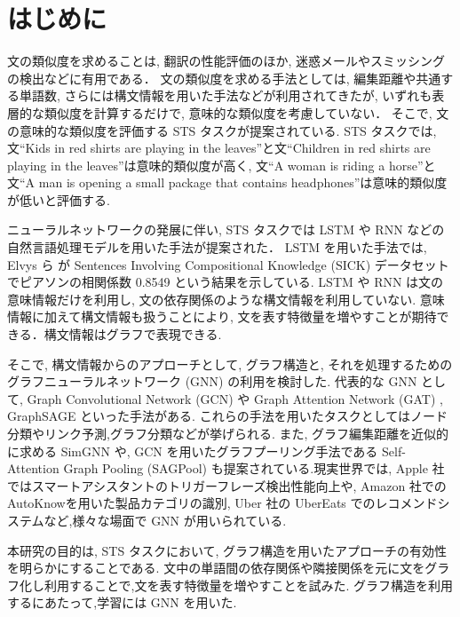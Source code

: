 \documentclass[a4j,12pt]{thesis} %
\begin{document}
\newcommand{\ctext}[1]{\raise0.2ex\hbox{\textcircled{\scriptsize{#1}}}}
\setlength{\baselineskip}{1.95zw}
\setlength{\textheight}{30\baselineskip}
\mainmatter

\fi
\renewcommand\thefootnote{\arabic{footnote}}



\chapter{はじめに}\label{intro}
文の類似度を求めることは, 翻訳の性能評価のほか, 迷惑メールやスミッシングの検出などに有用である．
文の類似度を求める手法としては, 編集距離や共通する単語数, さらには構文情報を用いた手法などが利用されてきたが, いずれも表層的な類似度を計算するだけで, 意味的な類似度を考慮していない．
そこで, 文の意味的な類似度を評価する STS タスクが提案されている.
STS タスクでは, 文``Kids in red shirts are playing in the leaves''と文``Children in red shirts are playing in the leaves''は意味的類似度が高く, 文``A woman is riding a horse''と文``A man is opening a small package that contains headphones''は意味的類似度が低いと評価する.
\par ニューラルネットワークの発展に伴い, STS タスクでは LSTM や RNN などの自然言語処理モデルを用いた手法が提案された．
LSTM を用いた手法では, Elvys ら \cite{elvys2018predicting} が Sentences Involving Compositional Knowledge (SICK) データセットでピアソンの相関係数 0.8549 という結果を示している.
LSTM や RNN は文の意味情報だけを利用し, 文の依存関係のような構文情報を利用していない.
意味情報に加えて構文情報も扱うことにより, 文を表す特徴量を増やすことが期待できる．構文情報はグラフで表現できる.
\par そこで, 構文情報からのアプローチとして, グラフ構造と, それを処理するためのグラフニューラルネットワーク (GNN) の利用を検討した.
代表的な GNN として, Graph Convolutional Network (GCN) \cite{kipf2017semi} や Graph Attention Network (GAT) \cite{velickovic2018graph}, GraphSAGE \cite{hamilton2017inductive} といった手法がある. これらの手法を用いたタスクとしてはノード分類やリンク予測,グラフ分類などが挙げられる. また, グラフ編集距離を近似的に求める SimGNN や, GCN を用いたグラフプーリング手法である Self-Attention Graph Pooling (SAGPool) も提案されている.現実世界では,
Apple 社ではスマートアシスタントのトリガーフレーズ検出性能向上\cite{pranay2020lattice}や, Amazon 社での AutoKnow\cite{xin2020autoknow}を用いた製品カテゴリの識別, Uber 社の UberEats でのレコメンドシステムなど,様々な場面で GNN が用いられている.
\par 本研究の目的は, STS タスクにおいて, グラフ構造を用いたアプローチの有効性を明らかにすることである.
文中の単語間の依存関係や隣接関係を元に文をグラフ化し利用することで,文を表す特徴量を増やすことを試みた.
グラフ構造を利用するにあたって,学習には GNN を用いた.
\end{document}
